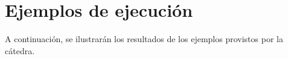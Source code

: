 \section{Ejemplos de ejecución}

A continuación, se ilustrarán los resultados de los ejemplos provistos por la cátedra. 


